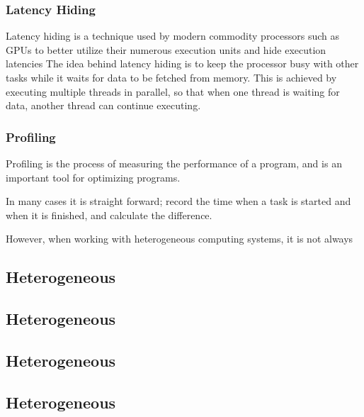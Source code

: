 \subsubsection{Latency Hiding}
Latency hiding is a technique used by modern commodity processors such as GPUs to better utilize their numerous execution units and hide execution latencies \cite[35]{VolkovLatencyHiding2016}
The idea behind latency hiding is to keep the processor busy with other tasks while it waits for data to be fetched from memory.
This is achieved by executing multiple threads in parallel, so that when one thread is waiting for data, another thread can continue executing.


\subsubsection{Profiling}
Profiling is the process of measuring the performance of a program, and is an important tool for optimizing programs.

In many cases it is straight forward; record the time when a task is started and when it is finished, and calculate the difference.


However, when working with heterogeneous computing systems, it is not always


\subsection{Heterogeneous}
\subsection{Heterogeneous}
\subsection{Heterogeneous}
\subsection{Heterogeneous}
